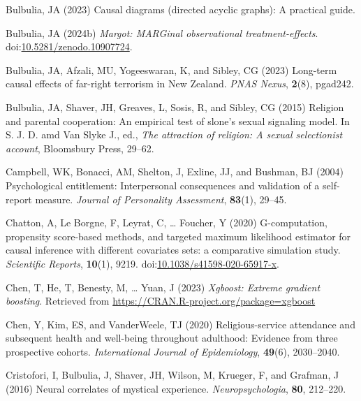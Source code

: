 \documentclass[
  single column]{article}
\newlength{\cslhangindent}
\newenvironment{CSLReferences}[2] %
 {\begin{list}{}{%
  \setlength{\itemindent}{0pt}
  \setlength{\leftmargin}{0pt}
  \setlength{\parsep}{0pt}
  \ifodd #1
   \setlength{\leftmargin}{\cslhangindent}
   \setlength{\itemindent}{-1\cslhangindent}
  \fi
  \setlength{\itemsep}{#2\baselineskip}}}
 {\end{list}}
\begin{document}
\begin{CSLReferences}{1}{0}
Bulbulia, JA (2023) Causal diagrams (directed acyclic graphs): A
practical guide.

Bulbulia, JA (2024b) \emph{Margot: MARGinal observational
treatment-effects}.
doi:\href{https://doi.org/10.5281/zenodo.10907724}{10.5281/zenodo.10907724}.

Bulbulia, JA, Afzali, MU, Yogeeswaran, K, and Sibley, CG (2023)
Long-term causal effects of far-right terrorism in {N}ew {Z}ealand.
\emph{PNAS Nexus}, \textbf{2}(8), pgad242.

Bulbulia, JA, Shaver, JH, Greaves, L, Sosis, R, and Sibley, CG (2015)
Religion and parental cooperation: An empirical test of slone's sexual
signaling model. In S. J. D. amd Van Slyke J., ed., \emph{The attraction
of religion: A sexual selectionist account}, Bloomsbury Press, 29--62.

Campbell, WK, Bonacci, AM, Shelton, J, Exline, JJ, and Bushman, BJ
(2004) Psychological entitlement: Interpersonal consequences and
validation of a self-report measure. \emph{Journal of Personality
Assessment}, \textbf{83}(1), 29--45.

Chatton, A, Le Borgne, F, Leyrat, C, \ldots{} Foucher, Y (2020)
G-computation, propensity score-based methods, and targeted maximum
likelihood estimator for causal inference with different covariates
sets: a comparative simulation study. \emph{Scientific Reports},
\textbf{10}(1), 9219.
doi:\href{https://doi.org/10.1038/s41598-020-65917-x}{10.1038/s41598-020-65917-x}.

Chen, T, He, T, Benesty, M, \ldots{} Yuan, J (2023) \emph{Xgboost:
Extreme gradient boosting}. Retrieved from
\url{https://CRAN.R-project.org/package=xgboost}

Chen, Y, Kim, ES, and VanderWeele, TJ (2020) Religious-service
attendance and subsequent health and well-being throughout adulthood:
Evidence from three prospective cohorts. \emph{International Journal of
Epidemiology}, \textbf{49}(6), 2030--2040.

Cristofori, I, Bulbulia, J, Shaver, JH, Wilson, M, Krueger, F, and
Grafman, J (2016) Neural correlates of mystical experience.
\emph{Neuropsychologia}, \textbf{80}, 212--220.


\end{CSLReferences}
\end{document}
